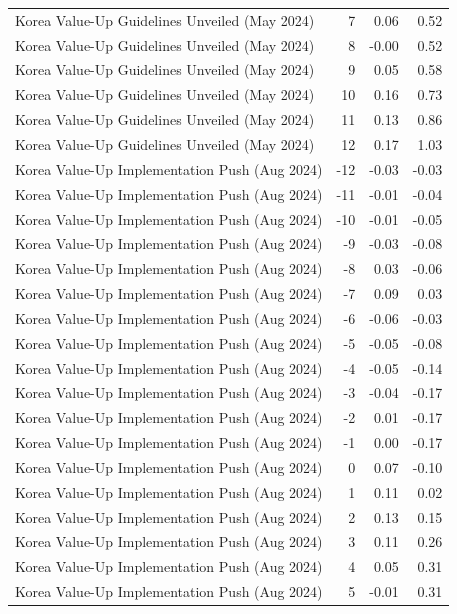 \begin{table}
\begin{tabular}{lrrr}
Korea Value-Up Guidelines Unveiled (May 2024) & 7 & 0.06 & 0.52 \\
Korea Value-Up Guidelines Unveiled (May 2024) & 8 & -0.00 & 0.52 \\
Korea Value-Up Guidelines Unveiled (May 2024) & 9 & 0.05 & 0.58 \\
Korea Value-Up Guidelines Unveiled (May 2024) & 10 & 0.16 & 0.73 \\
Korea Value-Up Guidelines Unveiled (May 2024) & 11 & 0.13 & 0.86 \\
Korea Value-Up Guidelines Unveiled (May 2024) & 12 & 0.17 & 1.03 \\
Korea Value-Up Implementation Push (Aug 2024) & -12 & -0.03 & -0.03 \\
Korea Value-Up Implementation Push (Aug 2024) & -11 & -0.01 & -0.04 \\
Korea Value-Up Implementation Push (Aug 2024) & -10 & -0.01 & -0.05 \\
Korea Value-Up Implementation Push (Aug 2024) & -9 & -0.03 & -0.08 \\
Korea Value-Up Implementation Push (Aug 2024) & -8 & 0.03 & -0.06 \\
Korea Value-Up Implementation Push (Aug 2024) & -7 & 0.09 & 0.03 \\
Korea Value-Up Implementation Push (Aug 2024) & -6 & -0.06 & -0.03 \\
Korea Value-Up Implementation Push (Aug 2024) & -5 & -0.05 & -0.08 \\
Korea Value-Up Implementation Push (Aug 2024) & -4 & -0.05 & -0.14 \\
Korea Value-Up Implementation Push (Aug 2024) & -3 & -0.04 & -0.17 \\
Korea Value-Up Implementation Push (Aug 2024) & -2 & 0.01 & -0.17 \\
Korea Value-Up Implementation Push (Aug 2024) & -1 & 0.00 & -0.17 \\
Korea Value-Up Implementation Push (Aug 2024) & 0 & 0.07 & -0.10 \\
Korea Value-Up Implementation Push (Aug 2024) & 1 & 0.11 & 0.02 \\
Korea Value-Up Implementation Push (Aug 2024) & 2 & 0.13 & 0.15 \\
Korea Value-Up Implementation Push (Aug 2024) & 3 & 0.11 & 0.26 \\
Korea Value-Up Implementation Push (Aug 2024) & 4 & 0.05 & 0.31 \\
Korea Value-Up Implementation Push (Aug 2024) & 5 & -0.01 & 0.31 \\

\end{tabular}
\end{table}
